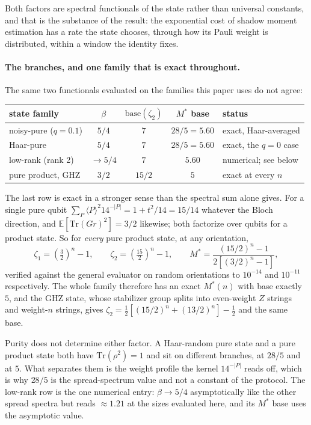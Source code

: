 Both factors are spectral functionals of the state rather than universal constants, and that is
the substance of the result: the exponential cost of shadow moment estimation has a rate the
state chooses, through how its Pauli weight is distributed, within a window the identity fixes.

\paragraph{The branches, and one family that is exact throughout.}
The same two functionals evaluated on the families this paper uses do not agree:

\begin{center}
\begin{tabular}{lcccl}
\hline
state family & \(\beta\) & \(\mathrm{base}(\zeta_2)\) & \(M^*\) base & status \\
\hline
noisy-pure (\(q=0.1\)) & \(5/4\) & \(7\)    & \(28/5 = 5.60\) & exact, Haar-averaged \\
Haar-pure              & \(5/4\) & \(7\)    & \(28/5 = 5.60\) & exact, the \(q = 0\) case \\
low-rank (rank 2)      & \(\to 5/4\) & \(7\) & \(5.60\)        & numerical; see below \\
pure product, GHZ      & \(3/2\) & \(15/2\) & \(5\)           & exact at every \(n\) \\
\hline
\end{tabular}
\end{center}

\noindent
The last row is exact in a stronger sense than the spectral sum alone gives. For a single pure
qubit \(\sum_{P} \langle P\rangle^2 14^{-|P|} = 1 + t^2/14 = 15/14\) whatever the Bloch
direction, and \(\mathbb{E}[\mathrm{Tr}(Gr)^2] = 3/2\) likewise; both factorize over qubits for
a product state. So for \emph{every} pure product state, at any orientation,
\[
\zeta_1 = \left(\tfrac{3}{2}\right)^{\! n} \!- 1, \qquad
\zeta_2 = \left(\tfrac{15}{2}\right)^{\! n} \!- 1, \qquad
M^* = \frac{(15/2)^n - 1}{2\left[(3/2)^n - 1\right]},
\]
verified against the general evaluator on random orientations to \(10^{-14}\) and \(10^{-11}\)
respectively. The whole family therefore has an exact \(M^*(n)\) with base exactly \(5\), and
the GHZ state, whose stabilizer group splits into even-weight \(Z\) strings and weight-\(n\)
strings, gives \(\zeta_2 = \tfrac12[(15/2)^n + (13/2)^n] - \tfrac12\) and the same base.

Purity does not determine either factor. A Haar-random pure state and a pure product state both
have \(\mathrm{Tr}(\rho^2) = 1\) and sit on different branches, at \(28/5\) and at \(5\). What
separates them is the weight profile the kernel \(14^{-|P|}\) reads off, which is why \(28/5\)
is the spread-spectrum value and not a constant of the protocol. The low-rank row is the one
numerical entry: \(\beta \to 5/4\) asymptotically like the other spread spectra but reads
\(\approx 1.21\) at the sizes evaluated here, and its \(M^*\) base uses the asymptotic value.

